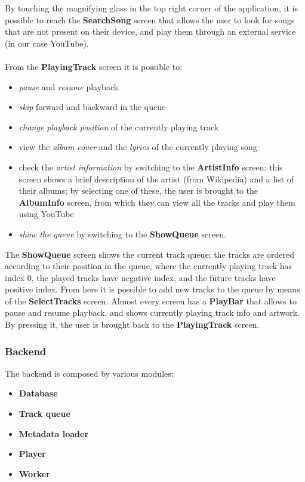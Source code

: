 \documentclass{article}
\begin{document}
By touching the magnifying glass in the top right corner of the application, it
is possible to reach the \textbf{SearchSong} screen that allows the user to look
for songs that are not present on their device, and play them through an
external service (in our case YouTube).
\\\\
From the \textbf{PlayingTrack} screen it is possible to:
\begin{itemize}
    \item \textit{pause} and \textit{resume} playback
    \item \textit{skip} forward and backward in the queue
    \item \textit{change playback position} of the currently playing track
    \item view the \textit{album cover} and the \textit{lyrics} of the currently
        playing song
    \item check the \textit{artist information} by switching to the
        \textbf{ArtistInfo} screen: this screen shows a brief description of the
        artist (from Wikipedia) and a list of their albums; by selecting one of
        these, the user is brought to the \textbf{AlbumInfo} screen, from which 
        they can view all the tracks and play them using YouTube
    \item \textit{show the queue} by switching to the \textbf{ShowQueue} screen.

\end{itemize}

The \textbf{ShowQueue} screen shows the current track queue; the tracks are
ordered according to their position in the queue, where the currently playing
track has index 0, the played tracks have negative index, and the future tracks
have positive index. From here it is possible to add new tracks to the queue by
means of the \textbf{SelectTracks} screen. Almost every screen has a
\textbf{PlayBar} that allows to pause and resume playback, and shows currently
playing track info and artwork. By pressing it, the user is brought back to the
\textbf{PlayingTrack} screen.

\subsubsection{Backend}
The backend is composed by various modules:
\begin{itemize}
    \item \textbf{Database}
    \item \textbf{Track queue}
    \item \textbf{Metadata loader}
    \item \textbf{Player}
    \item \textbf{Worker}
\end{itemize}
\end{document}
